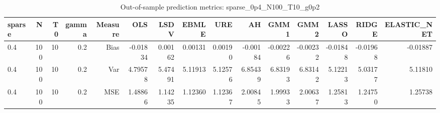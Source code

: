 \begin{table}[!htbp]\centering
\caption{Out-of-sample prediction metrics: sparse_0p4_N100_T10_g0p2}
\label{tab:table3_sparse_0p4_N100_T10_g0p2}
\begin{tabular}{lrrrrrrrrrrrrrr}
\hline
sparse & N & T0 & gamma & Measure & OLS & LSDV & EBMLE & URE & AH & GMM1 & GMM2 & LASSO & RIDGE & ELASTIC_NET \\
\hline
0.4 & 100 & 10 & 0.2 & Bias & -0.01834 & 0.00162 & 0.00131 & 0.00190 & -0.00184 & -0.00226 & -0.00232 & -0.01848 & -0.01968 & -0.01887 \\
0.4 & 100 & 10 & 0.2 & Var & 4.79578 & 5.47491 & 5.11913 & 5.12576 & 6.85439 & 6.83193 & 6.83142 & 5.12213 & 5.03177 & 5.11810 \\
0.4 & 100 & 10 & 0.2 & MSE & 1.48866 & 1.14235 & 1.12360 & 1.12367 & 2.00845 & 1.99933 & 2.00637 & 1.25813 & 1.24750 & 1.25738 \\
\hline
\end{tabular}
\end{table}

